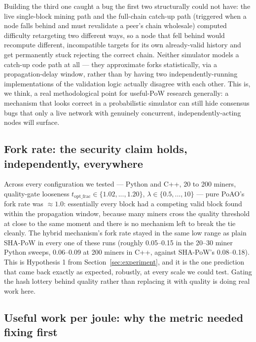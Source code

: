 \documentclass[journal]{IEEEtran}
\begin{document}
Building the third one caught a bug the first two structurally could not
have: the live single-block mining path and the full-chain catch-up path
(triggered when a node falls behind and must revalidate a peer's chain
wholesale) computed difficulty retargeting two different ways, so a node
that fell behind would recompute different, incompatible targets for its
own already-valid history and get permanently stuck rejecting the correct
chain. Neither simulator models a catch-up code path at all --- they
approximate forks statistically, via a propagation-delay window, rather
than by having two independently-running implementations of the validation
logic actually disagree with each other. This is, we think, a real
methodological point for useful-PoW research generally: a mechanism that
looks correct in a probabilistic simulator can still hide consensus bugs
that only a live network with genuinely concurrent, independently-acting
nodes will surface.

\subsection{Fork rate: the security claim holds, independently, everywhere}
\label{sec:mechanism-quality-check}

Across every configuration we tested --- Python and C++, 20 to 200 miners,
quality-gate looseness $t_{\text{opt\_frac}} \in \{1.02, ..., 1.20\}$,
$\lambda \in \{0.5, ..., 10\}$ --- pure PoAO's fork rate was $\approx 1.0$:
essentially every block had a competing valid block found within the
propagation window, because many miners cross the quality threshold at
close to the same moment and there is no mechanism left to break the tie
cleanly. The hybrid mechanism's fork rate stayed in the same low range as
plain SHA-PoW in every one of these runs (roughly 0.05--0.15 in the 20--30
miner Python sweeps, 0.06--0.09 at 200 miners in C++, against SHA-PoW's
0.08--0.18). This is Hypothesis 1 from Section~\ref{sec:experiment},
and it is the one prediction that came back exactly as expected, robustly,
at every scale we could test. Gating the hash lottery behind quality rather
than replacing it with quality is doing real work here.

\subsection{Useful work per joule: why the metric needed fixing first}
\label{sec:energy-metric}
\end{document}
